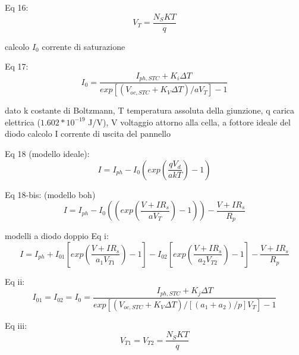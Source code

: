 \documentclass{article}
\begin{document}
Eq 16:
\begin{equation}
    V_{T}=\frac{N_{S}KT}{q}
\end{equation}

calcolo $I_{0}$ corrente di saturazione

Eq 17:
\begin{equation}
    I_{0}=\frac{I_{ph,STC}+K_{i}\Delta T}{exp[(V_{oc,STC}+K_{V}\Delta T)/aV_{T}]-1}
\end{equation}

dato k costante di Boltzmann, T temperatura assoluta della giunzione, q carica elettrica ($1.602*10^{-19}$ J/V), V voltaggio attorno alla cella, a fottore ideale del diodo calcolo I corrente di uscita del pannello

Eq 18 (modello ideale):
\begin{equation}
    I=I_{ph}-I_{0}\left(exp\left(\frac{qV_{d}}{akT}\right)-1\right)
\end{equation}

Eq 18-bis: (modello boh)
\begin{equation}
    I=I_{ph}-I_{0}\left(\left(exp\left(\frac{V+IR_{s}}{a V_{T}}\right)-1\right)\right)-\frac{V+IR_{s}}{R_{p}}
\end{equation}


modelli a diodo doppio
Eq i:
\begin{equation}
    I=I_{ph}+I_{01}\left[exp\left(\frac{V+IR_{s}}{a_{1}V_{T1}}\right)-1\right]-I_{02}\left[exp\left(\frac{V+IR_{s}}{a_{2}V_{T2}}\right)-1\right]-\frac{V+IR_{s}}{R_{p}}
\end{equation}

Eq ii:
\begin{equation}
    I_{01}=I_{02}=I_{0}=\frac{I_{ph,STC}+K_{j}\Delta T}{exp[(V_{oc,STC}+K_{V}\Delta T)/[(a_{1}+a_{2})/p]V_{T}]-1}
\end{equation}


Eq iii:
\begin{equation}
    V_{T1}=V_{T2}=\frac{N_{S}KT}{q}
\end{equation}
\end{document}
